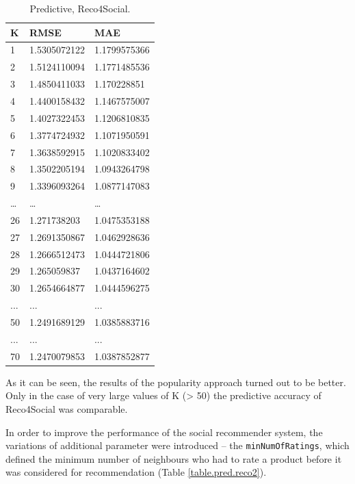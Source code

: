 \documentclass[12pt]{report}
\begin{document}
\begin{table}[htpb]
\centering
\caption{Predictive, Reco4Social.}
\label{table.pred.reco1}
\vspace{3mm}
\begin{tabular}{|l|l|l|}
\hline
{\bf K} & {\bf RMSE}   & {\bf MAE}    \\ \hline
1       & 1.5305072122 & 1.1799575366 \\ \hline
2       & 1.5124110094 & 1.1771485536 \\ \hline
3       & 1.4850411033 & 1.170228851  \\ \hline
4       & 1.4400158432 & 1.1467575007 \\ \hline
5       & 1.4027322453 & 1.1206810835 \\ \hline
6       & 1.3774724932 & 1.1071950591 \\ \hline
7       & 1.3638592915 & 1.1020833402 \\ \hline
8       & 1.3502205194 & 1.0943264798 \\ \hline
9       & 1.3396093264 & 1.0877147083 \\ \hline
…       & …            & …            \\ \hline
26      & 1.271738203  & 1.0475353188 \\ \hline
27      & 1.2691350867 & 1.0462928636 \\ \hline
28      & 1.2666512473 & 1.0444721806 \\ \hline
29      & 1.265059837  & 1.0437164602 \\ \hline
30      & 1.2654664877 & 1.0444596275 \\ \hline
...     & ...          & ...          \\ \hline
50      & 1.2491689129 & 1.0385883716 \\ \hline
...     & ...          & ...          \\ \hline
70      & 1.2470079853 & 1.0387852877 \\ \hline
\end{tabular}
\end{table}

As it can be seen, the results of the popularity approach turned out to be better. Only in the case of very large values of K (> 50) the predictive accuracy of Reco4Social was comparable.

In order to improve the performance of the social recommender system, the variations of additional parameter were introduced -- the \texttt{min\-Num\-Of\-Ratings}, which defined the minimum number of neighbours who had to rate a product before it was considered for recommendation (Table \ref{table.pred.reco2}). 
\end{document}
